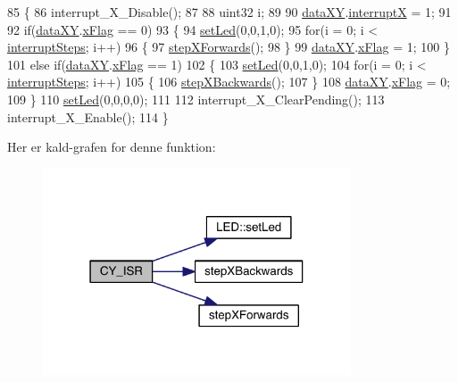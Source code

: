 \begin{DoxyCode}
85 \{
86   interrupt\_X\_Disable();
87   
88   uint32 i;
89   
90   \hyperlink{data_8h_a89d7998a721b3f36f9f4131e7a5e42d2}{dataXY}.\hyperlink{data_8h_a4cacb2964bb4b589bf79aa64a398725b}{interruptX} = 1;
91   
92   \textcolor{keywordflow}{if}(\hyperlink{data_8h_a89d7998a721b3f36f9f4131e7a5e42d2}{dataXY}.\hyperlink{data_8h_abd60bb18cb69d4a782e0334caad9ffbc}{xFlag} == 0)
93   \{
94     \hyperlink{led_8h_a1d8e725e3829da99c1d027ba0a2ce57a}{setLed}(0,0,1,0);
95     \textcolor{keywordflow}{for}(i = 0; i < \hyperlink{xy_8h_a319d8f8cbb816fc1ca2306587712b0b7}{interruptSteps}; i++)
96     \{
97       \hyperlink{class_x_y_a77f23b16c6fae141a892ed476b325184}{stepXForwards}();
98     \}
99     \hyperlink{data_8h_a89d7998a721b3f36f9f4131e7a5e42d2}{dataXY}.\hyperlink{data_8h_abd60bb18cb69d4a782e0334caad9ffbc}{xFlag} = 1;
100   \}
101   \textcolor{keywordflow}{else} \textcolor{keywordflow}{if}(\hyperlink{data_8h_a89d7998a721b3f36f9f4131e7a5e42d2}{dataXY}.\hyperlink{data_8h_abd60bb18cb69d4a782e0334caad9ffbc}{xFlag} == 1)
102   \{
103     \hyperlink{led_8h_a1d8e725e3829da99c1d027ba0a2ce57a}{setLed}(0,0,1,0);
104     \textcolor{keywordflow}{for}(i = 0; i < \hyperlink{xy_8h_a319d8f8cbb816fc1ca2306587712b0b7}{interruptSteps}; i++)
105     \{
106       \hyperlink{class_x_y_a30e07320705aa878e1f5a1b959eba099}{stepXBackwards}();
107     \}
108     \hyperlink{data_8h_a89d7998a721b3f36f9f4131e7a5e42d2}{dataXY}.\hyperlink{data_8h_abd60bb18cb69d4a782e0334caad9ffbc}{xFlag} = 0;
109   \}
110   \hyperlink{led_8h_a1d8e725e3829da99c1d027ba0a2ce57a}{setLed}(0,0,0,0);
111   
112   interrupt\_X\_ClearPending();
113   interrupt\_X\_Enable();
114 \}
\end{DoxyCode}


Her er kald-\/grafen for denne funktion\+:
\nopagebreak
\begin{figure}[H]
\begin{center}
\leavevmode
\includegraphics[width=259pt]{db/d87/class_x_y_acf3833934859a01c669d97fc4dfd7f41_cgraph}
\end{center}
\end{figure}


